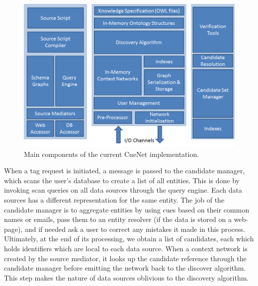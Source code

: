 \begin{figure}[t]
\centering
\includegraphics[width=\textwidth]{media/chapter4/detailed-concept-arch.png}
\caption{Main components of the current CueNet implementation.}
\label{fig:d-concept-arch}
\end{figure}

When a tag request is initiated, a message is passed to the candidate manager, which scans the user's database to create a list of all entities. This is done by invoking scan queries on all data sources through the query engine. Each data sources has a different representation for the same entity. The job of the candidate manager is to aggregate entities by using cues based on their common names or emails, pass them to an entity resolver (if the data is stored on a web-page), and if needed ask a user to correct any mistakes it made in this process. Ultimately, at the end of its processing, we obtain a list of candidates, each which holds identifiers which are local to each data source. When a context network is created by the source mediator, it looks up the candidate reference through the candidate manager before emitting the network back to the discover algorithm. This step makes the nature of data sources oblivious to the discovery algorithm.


